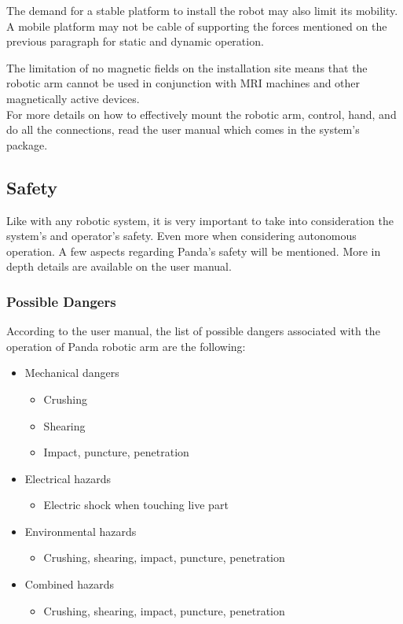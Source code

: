 The demand for a stable platform to install the robot may also limit its mobility. A mobile platform may not be cable of supporting the forces mentioned on the previous paragraph for static and dynamic operation.

The limitation of no magnetic fields on the installation site means that the robotic arm cannot be used in conjunction with MRI machines and other magnetically active devices.\\

For more details on how to effectively mount the robotic arm, control, hand, and do all the connections, read the user manual which comes in the system's package.


\subsection{Safety}
\label{subsec:robotic_system_operation_safety}

Like with any robotic system, it is very important to take into consideration the system's and operator's safety. Even more when considering autonomous operation. A few aspects regarding Panda's safety will be mentioned. More in depth details are available on the user manual.

\subsubsection*{Possible Dangers}
\label{subsubsec:robotic_system_operation_safety_possible_dangers}

According to the user manual, the list of possible dangers associated with the operation of Panda robotic arm are the following:

\begin{itemize}
    \item Mechanical dangers
    \begin{itemize}
        \item Crushing
        \item Shearing
        \item Impact, puncture, penetration
    \end{itemize}
    \item Electrical hazards
    \begin{itemize}
        \item Electric shock when touching live part
    \end{itemize}
    \item Environmental hazards
    \begin{itemize}
        \item Crushing, shearing, impact, puncture, penetration
    \end{itemize}
    \item Combined hazards
    \begin{itemize}
        \item Crushing, shearing, impact, puncture, penetration
    \end{itemize}
\end{itemize}

